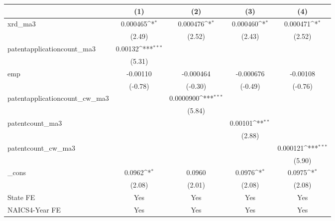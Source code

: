 {
\def\sym#1{\ifmmode^{#1}\else\(^{#1}\)\fi}
\begin{tabular}{l*{4}{c}}
\hline\hline
            &\multicolumn{1}{c}{(1)}         &\multicolumn{1}{c}{(2)}         &\multicolumn{1}{c}{(3)}         &\multicolumn{1}{c}{(4)}         \\
\hline
xrd\_ma3     &    0.000465\sym{*}  &    0.000476\sym{*}  &    0.000460\sym{*}  &    0.000471\sym{*}  \\
            &      (2.49)         &      (2.52)         &      (2.43)         &      (2.52)         \\
[1em]
patentapplicationcount\_ma3&     0.00132\sym{***}&                     &                     &                     \\
            &      (5.31)         &                     &                     &                     \\
[1em]
emp         &    -0.00110         &   -0.000464         &   -0.000676         &    -0.00108         \\
            &     (-0.78)         &     (-0.30)         &     (-0.49)         &     (-0.76)         \\
[1em]
patentapplicationcount\_cw\_ma3&                     &   0.0000900\sym{***}&                     &                     \\
            &                     &      (5.84)         &                     &                     \\
[1em]
patentcount\_ma3&                     &                     &     0.00101\sym{**} &                     \\
            &                     &                     &      (2.88)         &                     \\
[1em]
patentcount\_cw\_ma3&                     &                     &                     &    0.000121\sym{***}\\
            &                     &                     &                     &      (5.90)         \\
[1em]
\_cons      &      0.0962\sym{*}  &      0.0960         &      0.0976\sym{*}  &      0.0975\sym{*}  \\
            &      (2.08)         &      (2.01)         &      (2.08)         &      (2.08)         \\
[1em]
State FE    &         Yes         &         Yes         &         Yes         &         Yes         \\
[1em]
NAICS4-Year FE&         Yes         &         Yes         &         Yes         &         Yes         \\

\end{tabular}}
